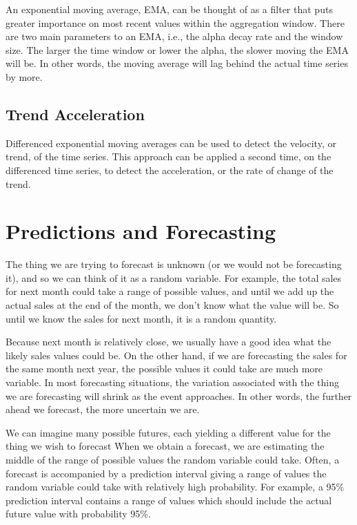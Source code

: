 \documentclass[openany]{book}
\begin{document}
An exponential moving average, EMA, can be thought of as a filter that puts greater importance on most recent values within the aggregation window. There are two main parameters to an EMA, i.e., the alpha decay rate and the window size. The larger the time window or lower the alpha, the slower moving the EMA will be. In other words, the moving average will lag behind the actual time series by more.

\subsection{Trend Acceleration}

Differenced exponential moving averages can be used to detect the velocity, or trend, of the time series. This approach can be applied a second time, on the differenced time series, to detect the acceleration, or the rate of change of the trend.

\section{Predictions and Forecasting}

The thing we are trying to forecast is unknown (or we would not be forecasting it), and so we can think of it as a random variable. For example, the total sales for next month could take a range of possible values, and until we add up the actual sales at the end of the month, we don’t know what the value will be. So until we know the sales for next month, it is a random quantity.

Because next month is relatively close, we usually have a good idea what the likely sales values could be. On the other hand, if we are forecasting the sales for the same month next year, the possible values it could take are much more variable. In most forecasting situations, the variation associated with the thing we are forecasting will shrink as the event approaches. In other words, the further ahead we forecast, the more uncertain we are.

We can imagine many possible futures, each yielding a different value for the thing we wish to forecast When we obtain a forecast, we are estimating the middle of the range of possible values the random variable could take. Often, a forecast is accompanied by a prediction interval giving a range of values the random variable could take with relatively high probability. For example, a 95\% prediction interval contains a range of values which should include the actual future value with probability 95\%.
\end{document}
